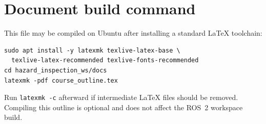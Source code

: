 \documentclass[11pt]{article}
\begin{document}
\section{Document build command}

This file may be compiled on Ubuntu after installing a standard LaTeX toolchain:

\begin{verbatim}
sudo apt install -y latexmk texlive-latex-base \
  texlive-latex-recommended texlive-fonts-recommended
cd hazard_inspection_ws/docs
latexmk -pdf course_outline.tex
\end{verbatim}

Run \texttt{latexmk -c} afterward if intermediate LaTeX files should be
removed. Compiling this outline is optional and does not affect the ROS~2
workspace build.
\end{document}
